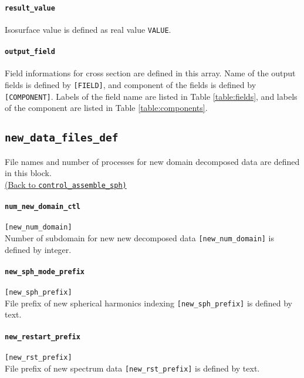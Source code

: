 %
\paragraph{\tt result\_value}
\label{href_t:result_value}
Isosurface value is defined as real value \verb|VALUE|.

%
\paragraph{\tt output\_field}
\label{href_t:iso_output_field}
Field informations for cross section are defined in this array. Name of the output fields is defined by \verb|[FIELD]|, and component of the fields is defined by \verb|[COMPONENT]|. Labels of the field name are listed in Table \ref{table:fields}, and labels of the component are listed in Table \ref{table:components}. \\
%
%
%

\subsection{\tt new\_data\_files\_def}
\label{href_t:new_data_files_def}
File names and number of processes for new domain decomposed data are defined in this block. \\
\hyperref[href_i:new_data_files_def]{(Back to {\tt control\_assemble\_sph)}}

\paragraph{\tt num\_new\_domain\_ctl}
\label{href_t:num_new_domain_ctl}
\verb|[new_num_domain]| \\
Number of subdomain for new new decomposed data \verb|[new_num_domain]| is defined by integer.

\paragraph{\tt new\_sph\_mode\_prefix}
\label{href_t:new_sph_mode_prefix}
\verb|[new_sph_prefix]| \\
File prefix of new spherical harmonics indexing \verb|[new_sph_prefix]| is defined by text.

\paragraph{\tt new\_restart\_prefix}
\label{href_t:new_restart_prefix}
\verb|[new_rst_prefix]| \\
File prefix of new spectrum data \verb|[new_rst_prefix]| is defined by text.

